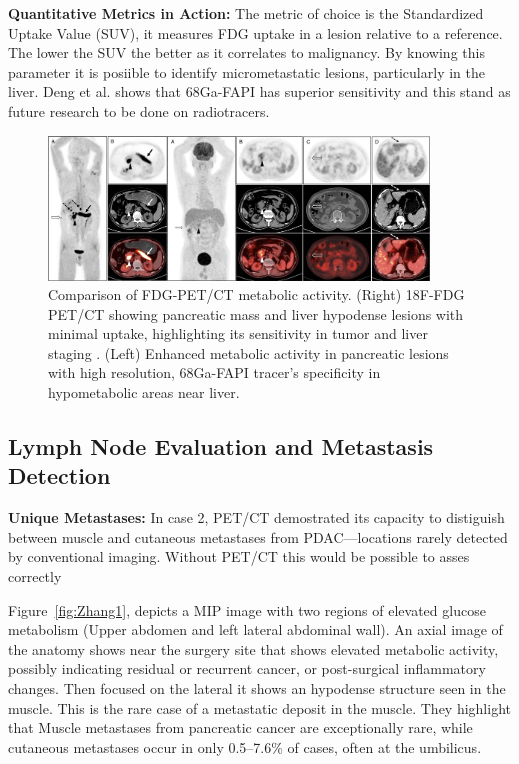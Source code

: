 \documentclass[11pt]{article} %
\begin{document}
\textbf{Quantitative Metrics in Action:} The metric of choice is the Standardized Uptake Value (SUV), it measures FDG uptake in a lesion relative to a reference. The lower the SUV the better as it correlates to malignancy. By knowing this parameter it is posiible to identify micrometastatic lesions, particularly in the liver. Deng et al. shows that 68Ga-FAPI has superior sensitivity and this stand as future research to be done on radiotracers.\cite{Deng2021}

\begin{figure}[ht]
    \centering
    \includegraphics[width=0.9\textwidth]{assets/DengMerged.png}
    \caption{Comparison of FDG-PET/CT metabolic activity. (Right) 18F-FDG PET/CT showing pancreatic mass and liver hypodense lesions with minimal uptake, highlighting its sensitivity in tumor and liver staging \cite{Deng2021}. (Left) Enhanced metabolic activity in pancreatic lesions with high resolution, 68Ga-FAPI tracer’s specificity in hypometabolic areas near liver\cite{Deng2021}.}
    \label{fig:DengMerged}
\end{figure}


\subsection{Lymph Node Evaluation and Metastasis Detection}

\textbf{Unique Metastases:} 
In case 2, PET/CT demostrated its capacity to distiguish between muscle and cutaneous metastases from PDAC—locations rarely detected by conventional imaging. Without PET/CT this would be possible to asses correctly

Figure~\ref{fig:Zhang1}, depicts a MIP image with two regions of elevated glucose metabolism (Upper abdomen and left lateral abdominal wall). An axial image of the anatomy shows near the surgery site that shows elevated metabolic activity, possibly indicating residual or recurrent cancer, or post-surgical inflammatory changes. Then focused on the lateral it shows an hypodense structure seen in the muscle. This is the rare case of a metastatic deposit in the muscle. They highlight that Muscle metastases from pancreatic cancer are exceptionally rare, while cutaneous metastases occur in only 0.5–7.6\% of cases, often at the umbilicus\cite{Zhang2023}.
\end{document}
